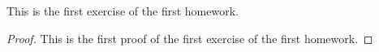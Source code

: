 \begin{exercise}
    This is the first exercise of the first homework.
\end{exercise}
\begin{proof}
    This is the first proof of the first exercise of the first homework.
\end{proof}